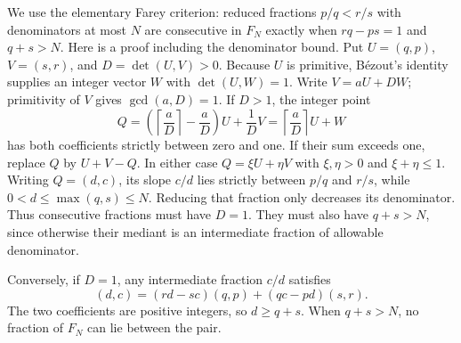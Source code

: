 \documentclass[11pt,a4paper]{article}
\theoremstyle{definition}
\theoremstyle{remark}
\numberwithin{equation}{section}
\begin{document}
We use the elementary Farey criterion: reduced fractions $p/q<r/s$
with denominators at most $N$ are consecutive in $F_N$ exactly when
$rq-ps=1$ and $q+s>N$. Here is a proof including the denominator bound.
Put $U=(q,p)$, $V=(s,r)$, and $D=\det(U,V)>0$.
Because $U$ is primitive, B\'ezout's identity supplies an integer
vector $W$ with $\det(U,W)=1$. Write $V=aU+DW$; primitivity of
$V$ gives $\gcd(a,D)=1$. If $D>1$, the integer point
\[
 Q=\left(\left\lceil\frac aD\right\rceil-\frac aD\right)U
       +\frac1D V
   =\left\lceil\frac aD\right\rceil U+W
\]
has both coefficients strictly between zero and one. If their sum
exceeds one, replace $Q$ by $U+V-Q$. In either case
$Q=\xi U+\eta V$ with $\xi,\eta>0$ and $\xi+\eta\le1$.
Writing $Q=(d,c)$, its slope $c/d$ lies strictly between $p/q$ and
$r/s$, while $0<d\le\max(q,s)\le N$. Reducing that fraction only
decreases its denominator. Thus consecutive fractions must have
$D=1$. They must also have $q+s>N$, since otherwise their mediant
is an intermediate fraction of allowable denominator.

Conversely, if $D=1$, any intermediate fraction $c/d$ satisfies
\[
 (d,c)=(rd-sc)(q,p)+(qc-pd)(s,r).
\]
The two coefficients are positive integers, so $d\ge q+s$.
When $q+s>N$, no fraction of $F_N$ can lie between the pair.
\end{document}
